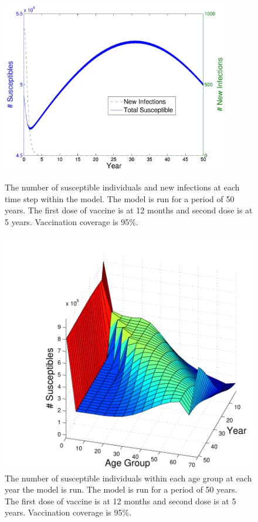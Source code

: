 \documentclass[a4paper,11pt] {scrartcl}
\begin{document}
\begin{figure}[hp]
	\centering
	\includegraphics[width=100mm]{measlesnowaningdouble95}
	\caption{The number of susceptible individuals and new infections at each time step within the model. The model is run for a period of 50 years. The first dose of vaccine is at 12 months and second dose is at 5 years. Vaccination coverage is 95\%.}
	\label{fig:resultsmeaslesnowaningdouble95}

	\includegraphics[width=120mm]{susceptibles3double95}
	\caption{The number of susceptible individuals within each age group at each year the model is run. The model is run for a period of 50 years. The first dose of vaccine is at 12 months and second dose is at 5 years. Vaccination coverage is 95\%.}
	\label{fig:resultssusceptibles3double95}
\end{figure}
\end{document}
